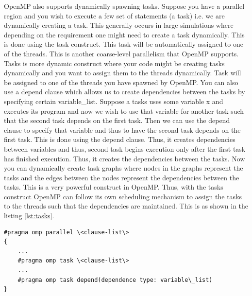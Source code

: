 \documentclass[12pt]{book}
\begin{document}
OpenMP also supports dynamically spawning tasks. Suppose you have a parallel region and you wish to execute a few set of statements (a task) i.e. we are dynamically creating a task.
This generally occurs in large simulations where depending on the requirement one might need to create a task dynamically. This is done using the task construct. This task will be automatically assigned to one of the threads.
This is another coarse-level parallelism that OpenMP supports. Tasks is more dynamic construct where your code might be creating tasks dynamically and you want to assign them to the threads dynamically.
Task will be assigned to one of the threads you have spawned by OpenMP. You can also use a depend clause which allows us to create dependencies between the tasks by specifying 
certain variable\_list. Suppose a tasks uses some variable x and executes its program and now we wish to use that variable for another task such that the second task depends on the first task.
Then we can use the depend clause to specify that variable and thus to have the second task depends on the first task. This is done using the depend clause. Thus, it creates dependencies between variables and thus, second task
begins execution only after the first task has finished execution. Thus, it creates the dependencies between the tasks.
Now you can dynamically create task graphs where nodes in the graphs represent the tasks and the edges between the nodes represent the dependencies between the tasks.
This is a very powerful construct in OpenMP. Thus, with the tasks construct OpenMP can follow its own scheduling mechanism to assign the tasks to the threads such that the dependencies are maintained.
This is as shown in the listing \ref{lst:tasks}.
\begin{lstlisting}[caption={Tasks Construct},captionpos=b,label={lst:tasks}]
#pragma omp parallel \<clause-list\>
{
    ...
    #pragma omp task \<clause-list\>
    ...
    #pragma omp task depend(dependence type: variable\_list)
}
\end{lstlisting}
\end{document}
